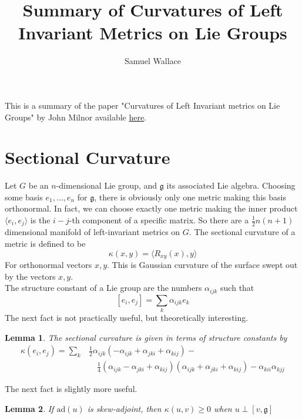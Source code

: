 \documentclass{article}
\title{Summary of Curvatures of Left Invariant Metrics on Lie Groups}
\author{Samuel Wallace}
\newtheorem{lem}{Lemma}
\begin{document}
\maketitle

\indent This is a summary of the paper "Curvatures of Left Invariant metrics on Lie Groups" by John Milnor available \href{https://core.ac.uk/download/pdf/82428733.pdf}{here}.


\section{Sectional Curvature}

\indent Let $G$ be an $n$-dimensional Lie group, and $\mathfrak{g}$ its associated Lie algebra. Choosing some basis $e_1, \ldots, e_n$ for $\mathfrak{g}$, there is obviously only one metric making this basis orthonormal. In fact, we can choose exactly one metric making the inner product $\langle e_i, e_j \rangle$ is the $i-j$-th component of a specific matrix. So there are a $\frac{1}{2}n(n+1)$ dimensional manifold of left-invariant metrics on $G$.
\indent The sectional curvature of a metric is defined to be 
\begin{equation}\label{eq:1}
    \kappa(x,y) = \langle R_{xy}(x),y \rangle
\end{equation}
\indent For orthonormal vectors $x,y$. This is Gaussian curvature of the surface swept out by the vectors $x,y$. \\
\indent The structure constant of a Lie group are the numbers $\alpha_{ijk}$ such that
\begin{equation}\label{eq:2}
    [e_i,e_j]=\sum_k \alpha_{ijk}e_k
\end{equation}
The next fact is not practically useful, but theoretically interesting.
\begin{lem}

The sectional curvature is given in terms of structure constants by 
\begin{align*}\label{eq:3}
    \kappa(e_i,e_j) = \sum_k  &\frac{1}{2}\alpha_{ijk}(-\alpha_{ijk}+\alpha_{jki} + \alpha_{kij}) - \\ &\quad \frac{1}{4}(\alpha_{ijk}-\alpha_{jki}+\alpha_{kij})(\alpha_{ijk}+\alpha_{jki}+\alpha_{kij}) - \alpha_{kii}\alpha_{kjj} 
\end{align*}
\end{lem}
\indent The next fact is slightly more useful.

\begin{lem}\label{lem:1}
If $\mathrm{ad}(u)$ is skew-adjoint, then $\kappa(u,v) \geq 0$ when $u \perp [v,\mathfrak{g}]$
\end{lem}
\end{document}
